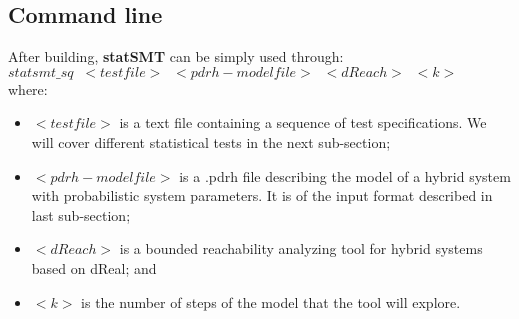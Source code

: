 \documentclass[runningheads,a4paper]{llncs}
\begin{document}
\subsection{Command line}
After building, {\bf statSMT} can be simply used through:\\

{\bf   
$statsmt\_sq\;\; <testfile> \;\;<pdrh-modelfile> \;\;<dReach>\;\;<k> $
}\\

where:
\begin{itemize}
\item $<testfile>$ is a text file containing a sequence of test specifications. We will cover different statistical tests in the next sub-section;
\item $<pdrh-modelfile>$ is a .pdrh file describing the model of a hybrid system with probabilistic system parameters. It is of the input format described in last sub-section;
\item $<dReach>$ is a bounded reachability analyzing tool for hybrid systems based on dReal; and
\item $<k>$ is the number of steps of the model that the tool will explore.\\
\end{itemize}
\end{document}
